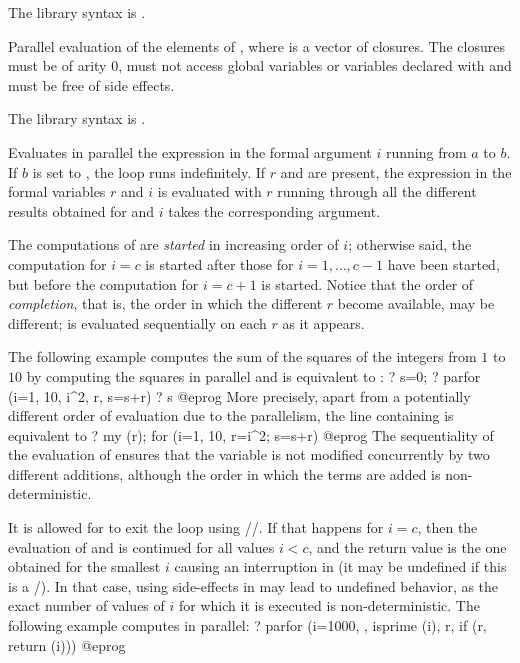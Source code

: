 {The library syntax is .

\label{se:pareval}
Parallel evaluation of the elements of , where  is a
vector of closures. The closures must be of arity $0$, must not access
global variables or variables declared with  and must be
free of side effects.

The library syntax is .

\label{se:parfor}
Evaluates in parallel the expression  in the formal
argument $i$ running from $a$ to $b$.
If $b$ is set to , the loop runs indefinitely.
If $r$ and  are present, the expression  in the
formal variables $r$ and $i$ is evaluated with $r$ running through all
the different results obtained for  and $i$ takes the
corresponding argument.

The computations of  are \emph{started} in increasing order
of $i$; otherwise said, the computation for $i=c$ is started after those
for $i=1, \ldots, c-1$ have been started, but before the computation for
$i=c+1$ is started. Notice that the order of \emph{completion}, that is,
the order in which the different $r$ become available, may be different;
 is evaluated sequentially on each $r$ as it appears.

The following example computes the sum of the squares of the integers
from $1$ to $10$ by computing the squares in parallel and is equivalent
to :
\bprog
? s=0;
? parfor (i=1, 10, i^2, r, s=s+r)
? s
@eprog
More precisely, apart from a potentially different order of evaluation
due to the parallelism, the line containing  is equivalent to
\bprog
? my (r); for (i=1, 10, r=i^2; s=s+r)
@eprog
The sequentiality of the evaluation of  ensures that the
variable  is not modified concurrently by two different additions,
although the order in which the terms are added is non-deterministic.

It is allowed for  to exit the loop using
//. If that happens for $i=c$,
then the evaluation of  and  is continued
for all values $i<c$, and the return value is the one obtained for
the smallest $i$ causing an interruption in  (it may be
undefined if this is a /).
In that case, using side-effects
in  may lead to undefined behavior, as the exact
number of values of $i$ for which it is executed is non-deterministic.
The following example computes  in parallel:
\bprog
? parfor (i=1000, , isprime (i), r, if (r, return (i)))
@eprog

}

